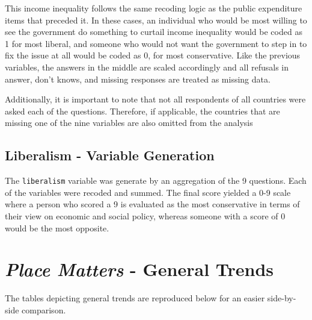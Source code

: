 \documentclass[12pt, titlepage]{article}
\newcommand\e{\emph}
\newcommand\txt{\texttt}
\begin{document}
\begin{appendices}
This income inequality follows the same recoding logic as the public expenditure items that preceded it. In these cases, an individual who would be most willing to see the government do something to curtail income inequality would be coded as 1 for most liberal, and someone who would not want the government to step in to fix the issue at all would be coded as 0, for most conservative. Like the previous variables, the answers in the middle are scaled accordingly and all refusals in answer, don't knows, and missing responses are treated as missing data.

Additionally, it is important to note that not all respondents of all countries were asked each of the questions. Therefore, if applicable, the countries that are missing one of the nine variables are also omitted from the analysis

\subsection{Liberalism - Variable Generation}

The \txt{liberalism} variable was generate by an aggregation of the 9 questions. Each of the variables were recoded and summed. The final score yielded a 0-9 scale where a person who scored a 9 is evaluated as the most conservative in terms of their view on economic and social policy, whereas someone with a score of 0 would be the most opposite.

\clearpage 


\section{\e{Place Matters} - General Trends}
\label{AppendixD}

The tables depicting general trends are reproduced below for an easier side-by-side comparison.


\end{appendices}
\end{document}
